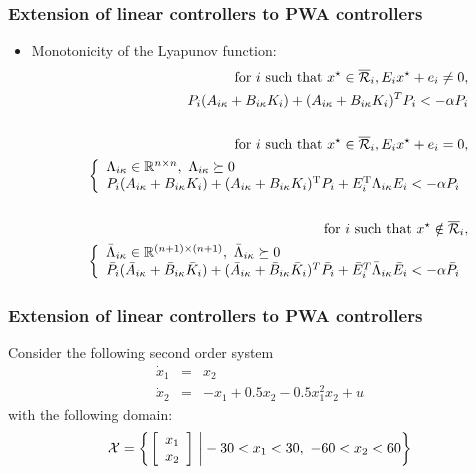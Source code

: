 \documentclass{beamer}
\newcommand{\TR}{\text{T}}
\newcommand{\RR}{{\cal R}}
\newcommand{\RE}{{\mathbb R}}
\newcommand{\beq}{\begin{equation*}}
\newcommand{\eeq}{\end{equation*}}
\newcommand{\bmat}{\left[\begin{array}}
\newcommand{\emat}{\end{array}\right]}
\begin{document}
  \frame
  {
    \frametitle{Extension of linear controllers to PWA controllers}
\begin{itemize}
\item Monotonicity of the Lyapunov function:
\begin{eqnarray*}
&&\text{ for } i\text{ such that }x^\star\in\overline\RR_i, E_ix^\star+e_i\neq 0,\nonumber\\
&&P_i(A_{i\kappa}+B_{i\kappa}K_i)+(A_{i\kappa}+B_{i\kappa}K_i)^T P_i<-\alpha P_i\\\nonumber\\
&&\text{ for } i\text{ such that }x^\star\in\overline\RR_i, E_ix^\star+e_i=0,\nonumber\\
&&\left\{\begin{array}{l}\Lambda_{i\kappa}\in\RE^{n\times n},\ \Lambda_{i\kappa}\succeq 0\\ 
 P_i(A_{i\kappa}+B_{i\kappa}K_i)+(A_{i\kappa}+B_{i\kappa}K_i)^\TR P_i+E_i^\TR\Lambda_{i\kappa}E_i<-\alpha P_i\end{array}\right.\\\nonumber\\
&&\text{ for } i\text{ such that }x^\star\notin\overline\RR_i,\nonumber\\
&&\left\{\begin{array}{l} \bar \Lambda_{i\kappa}\in\RE^{(n+1)\times (n+1)},\ \bar \Lambda_{i\kappa}\succeq 0\\
 \bar P_i(\bar A_{i\kappa}+\bar B_{i\kappa}\bar K_i)+(\bar A_{i\kappa}+\bar B_{i\kappa}\bar K_i)^T\bar P_i+\bar{E}_i^T\bar\Lambda_{i\kappa}\bar{E}_i<-\alpha\bar P_i\end{array}\right.
\end{eqnarray*}
\end{itemize}
  }

  \frame
  {
    \frametitle{Extension of linear controllers to PWA controllers}
Consider the following second order system
\begin{eqnarray*}
\dot x_1&=&x_2\\
\dot x_2&=&-x_1+0.5x_2-0.5x_1^2x_2+u
\end{eqnarray*}
with the following domain:
\beq
{\cal X}=\left\{\left.\bmat{c}x_1\\x_2\emat\ \right| -30<x_1<30,\ -60<x_2<60 \right\}
\eeq
}
\end{document}
